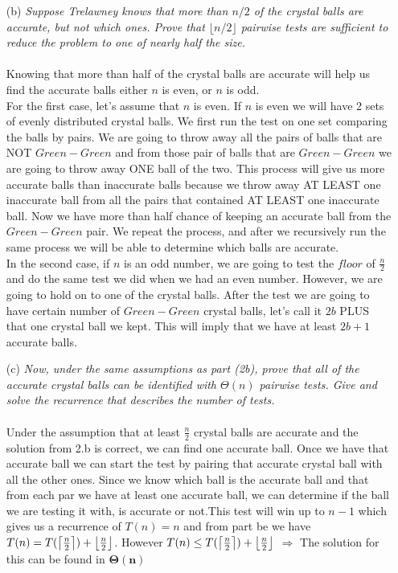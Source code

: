 \documentclass[12pt]{article} \setlength{\oddsidemargin}{0in}
\DeclarePairedDelimiter\floor{\lfloor}{\rfloor}
\begin{document}
{\begin{enumerate}
  
\item[(b)]{\textit{Suppose Trelawney knows that more than $n/2$ of the crystal	%
    balls are accurate, but not which ones. Prove that
    $\lfloor{n/2}\rfloor$ pairwise tests are sufficient to reduce the problem to
    one of nearly half the size.}}
  \\\\
Knowing that more than half of the crystal balls are accurate will help us find the accurate balls either $n$ is even, or $n$ is odd.\\ For the first case, let's assume that $n$ is even. If $n$ is even we will have 2 sets of evenly distributed crystal balls. We first run the test on one set comparing the balls by pairs. We are going to throw away all the pairs of balls that are NOT $Green-Green$ and from those pair of balls that are $Green-Green$ we are going to throw away ONE ball of the two. This process will give us more accurate balls than inaccurate balls because we throw away AT LEAST one inaccurate ball from all the pairs that contained AT LEAST one inaccurate ball. Now we have more than half chance of keeping an accurate ball from the $Green-Green$ pair. We repeat the process, and after we recursively run the same process we will be able to determine which balls are accurate. \\ In the second case, if $n$ is an odd number, we are going to test the $floor$ of $\frac{n}{2}$ and do the same test we did when we had an even number. However, we are going to hold on to one of the crystal balls. After the test we are going to have certain number of $Green-Green$ crystal balls, let's call it $2b$  PLUS that one crystal ball we kept. This will imply that we have at least $2b+1$ accurate balls. 



 
\item[(c)]{\textit{Now, under the same assumptions as part (2b), prove that	 	%
    all of the accurate crystal balls can be identified with
    $\Theta(n)$ pairwise tests. Give and solve the recurrence that
    describes the number of tests.}}
  \\\\
  Under the assumption that at least $\frac{n}{2}$ crystal balls are accurate and the solution from 2.b is correct, we can find one accurate ball. Once we have that accurate ball we can start the test by pairing that accurate crystal ball with all the other ones. Since we know which ball is the accurate ball and that from each par we have at least one accurate ball, we can determine if the ball we are testing it with, is accurate or not.This test will  win up to $n-1$ which gives us a recurrence of $T(n) = n$ and from part be we have $T(n) =  T(\ceil[\big]{\frac{n}{2}} ) + \floor[\big]{\frac{n}{2}}$. However $T(n) \leq T (\ceil[\big]{\frac{n}{2}} ) + \floor[\big]{\frac{n}{2}}$ $\mathbf{\Rightarrow}$ The solution for this can be found in $\mathbf{\Theta(n)}$ 


\end{enumerate}}
\end{document}
